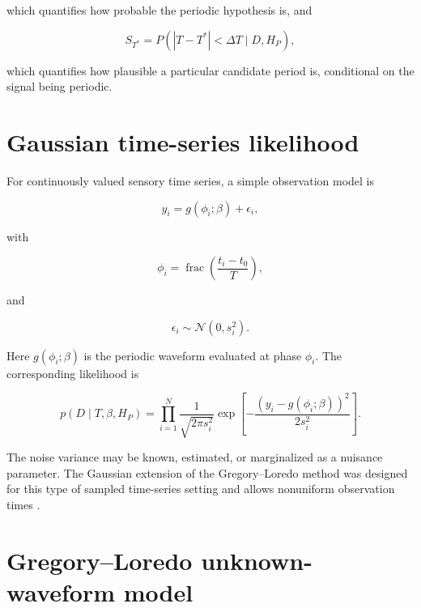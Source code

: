 \documentclass[a4paper]{article}
\begin{document}
which quantifies how probable the periodic hypothesis is, and

\begin{equation}
S_{T^{\ast}}
=
P\left(\left|T-T^{\ast}\right|<\Delta T\mid D,H_P\right),
\end{equation}

which quantifies how plausible a particular candidate period is, conditional on the signal being periodic.

\section{Gaussian time-series likelihood}

For continuously valued sensory time series, a simple observation model is

\begin{equation}
y_i
=
g\!\left(\phi_i;\beta\right)+\epsilon_i,
\end{equation}

with

\begin{equation}
\phi_i
=
\operatorname{frac}\!\left(\frac{t_i-t_0}{T}\right),
\end{equation}

and

\begin{equation}
\epsilon_i\sim\mathcal{N}(0,s_i^2).
\end{equation}

Here $g(\phi_i;\beta)$ is the periodic waveform evaluated at phase $\phi_i$. The corresponding likelihood is

\begin{equation}
p(D\mid T,\beta,H_P)
=
\prod_{i=1}^{N}
\frac{1}{\sqrt{2\pi s_i^2}}
\exp\left[
-\frac{\left(y_i-g(\phi_i;\beta)\right)^2}{2s_i^2}
\right].
\end{equation}

The noise variance may be known, estimated, or marginalized as a nuisance parameter. The Gaussian extension of the Gregory--Loredo method was designed for this type of sampled time-series setting and allows nonuniform observation times \citep{gregory-1999-bayesian-periodic-signal-detection-i-analysis-of-20-years-of-radio-flux-measurements-of-the-x-ray-binary-ls-i-plus-61-303}.

\section{Gregory--Loredo unknown-waveform model}
\end{document}
